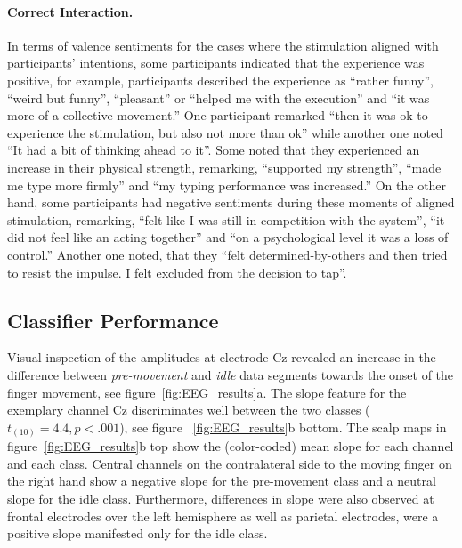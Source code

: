 \paragraph{Correct Interaction.} 
In terms of valence sentiments for the cases where the stimulation aligned with participants' intentions, some participants indicated that the experience was positive, for example, participants described the experience as ``rather funny'', ``weird but funny'', ``pleasant'' or ``helped me with the execution'' and ``it was more of a collective movement.'' One participant remarked ``then it was ok to experience the stimulation, but also not more than ok'' while another one noted ``It had a bit of thinking ahead to it''. Some noted that they experienced an increase in their physical strength, remarking, ``supported my strength'', ``made me type more firmly'' and ``my typing performance was increased.'' On the other hand, some participants had negative sentiments during these moments of aligned stimulation, remarking, ``felt like I was still in competition with the system'', ``it did not feel like an acting together'' and ``on a psychological level it was a loss of control.'' Another one noted, that they ``felt determined-by-others and then tried to resist the impulse. I felt excluded from the decision to tap''.

\subsection{Classifier Performance}
Visual inspection of the amplitudes at electrode Cz revealed an increase in the difference between \textit{pre-movement} and \textit{idle} data segments towards the onset of the finger movement, see figure~\ref{fig:EEG_results}a. The slope feature for the exemplary channel Cz discriminates well between the two classes (${t_{(10)}} = 4.4, p < .001$), see figure ~\ref{fig:EEG_results}b bottom. The scalp maps in figure~\ref{fig:EEG_results}b top show the (color-coded) mean slope for each channel and each class. Central channels on the contralateral side to the moving finger on the right hand show a negative slope for the pre-movement class and a neutral slope for the idle class. Furthermore, differences in slope were also observed at frontal electrodes over the left hemisphere as well as parietal electrodes, were a positive slope manifested only for the idle class. 

